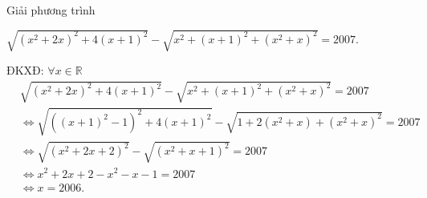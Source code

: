 \begin{ex}%
Giải phương trình
  \begin{center}
  $\sqrt{\left( x^2+2x\right)^2+4\left( x+1\right)^2}-\sqrt{x^2+\left( x+1\right) ^2+\left( x^2+x\right)^2}=2007$.
  \end{center}
\loigiai
    {ĐKXĐ: $\forall x\in \mathbb{R}$
    \begin{align*}
    &\sqrt{\left( x^2+2x\right)^2+4\left( x+1\right)^2}-\sqrt{x^2+\left( x+1\right) ^2+\left( x^2+x\right)^2}=2007  \\
    &\Leftrightarrow\sqrt{\left( (x+1)^2-1\right)^2+4\left( x+1\right)^2}-\sqrt{1+2(x^2+x) +\left( x^2+x\right)^2}=2007 \\
    &\Leftrightarrow\sqrt{\left( x^2+2x+2\right) ^2}-\sqrt{\left( x^2+x+1\right) ^2}=2007\\
    &\Leftrightarrow x^2+2x+2-x^2-x-1=2007\\
    &\Leftrightarrow x=2006.
    \end{align*}
    }
\end{ex}
